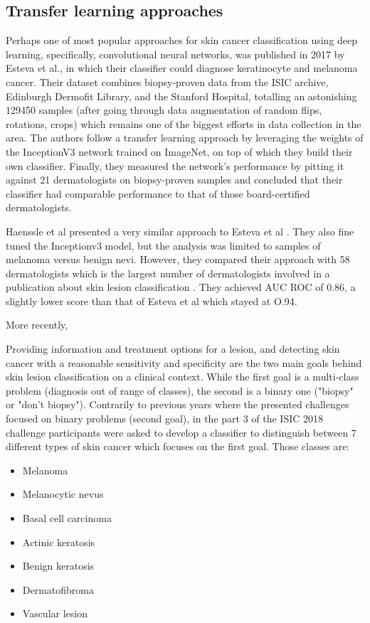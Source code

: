     
\subsection{Transfer learning approaches}
    Perhaps one of most popular approaches for skin cancer classification using deep learning, specifically, convolutional neural networks, was published in 2017 by Esteva et al.\cite{Esteva2017}, in which their classifier could diagnose keratinocyte and melanoma cancer. Their dataset combines biopsy-proven data from the ISIC archive, Edinburgh Dermofit Library, and the Stanford Hospital, totalling an astonishing 129450 samples (after going through data augmentation of random flips, rotations, crops) which remains one of the biggest efforts in data collection in the area.  The authors follow a transfer learning approach by leveraging the weights of the InceptionV3 network trained on ImageNet, on top of which they build their own classifier. Finally, they measured the network's performance by pitting it against 21 dermatologists on biopsy-proven samples and concluded that their classifier had comparable performance to that of those board-certified dermatologists.\par
    
    Haenssle et al \cite{Haenssle2018} presented a very similar approach to Esteva et al \cite{}. They also fine tuned the Inceptionv3 model, but the analysis was limited to samples of melanoma versus benign nevi. However, they compared their approach with 58 dermatologists which is the largest number of dermatologists involved in a publication about skin lesion classification \cite{Brinker2018}. They achieved AUC ROC of 0.86, a slightly lower score than that of Esteva et al which stayed at O.94. \par 
    More recently, 
    
    Providing information and treatment options for a lesion, and detecting skin cancer with a reasonable sensitivity and specificity are the two main goals behind skin lesion classification on a clinical context. While the first goal is a multi-class problem (diagnosis out of range of classes), the second is a binary one ("biopsy" or "don't biopsy"). Contrarily to previous years where the presented challenges focused on binary problems (second goal), in the part 3 of the ISIC 2018 challenge participants were asked to develop a classifier to distinguish between 7 different types of skin cancer which focuses on the first goal. Those classes are:
    \begin{itemize}
        \item Melanoma 
        \item Melanocytic nevus 
        \item Basal cell carcinoma 
        \item Actinic keratosis 
        \item Benign keratosis 
        \item Dermatofibroma 
        \item Vascular lesion
    \end{itemize}
    
